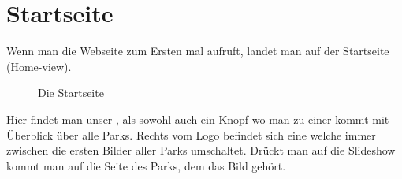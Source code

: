 \section{Startseite}
\label{home}

Wenn man die Webseite zum Ersten mal aufruft, landet man auf der Startseite (Home-view). 

\begin{figure}[H]
    \begin{center}
      \caption{Die Startseite}
    \end{center}
\end{figure}

Hier findet man unser , als sowohl auch ein Knopf wo man zu einer  kommt mit Überblick über alle 
Parks. Rechts vom Logo befindet sich eine  welche immer zwischen die ersten Bilder 
aller Parks umschaltet. Drückt man auf die Slideshow kommt man auf die  
Seite des Parks, dem das Bild gehört. 
